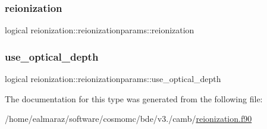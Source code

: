 \subsubsection{\texorpdfstring{reionization}{reionization}}
{\footnotesize\ttfamily logical reionization\+::reionizationparams\+::reionization}

\mbox{\label{structreionization_1_1reionizationparams_a0b87f0d29701a86823951781e9e1430a}} 
\subsubsection{\texorpdfstring{use\+\_\+optical\+\_\+depth}{use\_optical\_depth}}
{\footnotesize\ttfamily logical reionization\+::reionizationparams\+::use\+\_\+optical\+\_\+depth}



The documentation for this type was generated from the following file\+:\begin{DoxyCompactItemize}
\item 
/home/ealmaraz/software/cosmomc/bde/v3./camb/\mbox{\hyperlink{reionization_8f90}{reionization.\+f90}}\end{DoxyCompactItemize}
